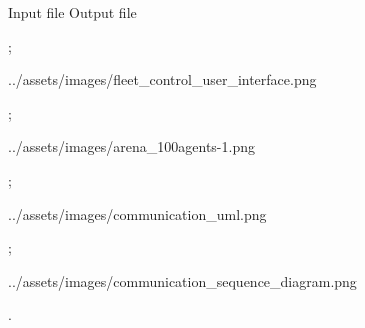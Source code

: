 
\midinsert

        \picw=4cm  Input file
        \picw=4cm  Output file
\endinsert

\pg;


\centerline{\picw=16cm \inspic ../assets/images/fleet_control_user_interface.png }

\pg;



\centerline{\picw=14cm \inspic ../assets/images/arena_100agents-1.png }

\pg;



\centerline{\picw=16cm \inspic ../assets/images/communication_uml.png }

\pg;


\centerline{\picw=16cm \inspic ../assets/images/communication_sequence_diagram.png }

\pg.

